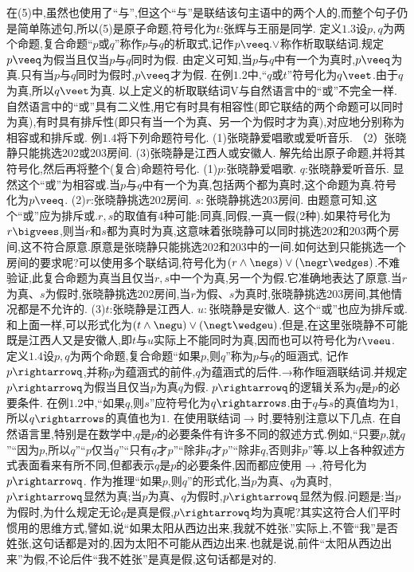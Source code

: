 {在(5)中,虽然也使用了“与”,但这个“与”是联结该句主语中的两个人的,而整个句子仍是简单陈述句,所以(5)是原子命题,符号化为$t$:张辉与王丽是同学.
定义$1.3$设$p,q$为两个命题,复合命题“$p$或$q$”称作$p$与$q$的析取式,记作$p\veeq.\vee$称作析取联结词.规定$p\veeq$为假当且仅当$p$与$q$同时为假.
由定义可知,当$p$与$q$中有一个为真时,$p\veeq$为真.只有当$p$与$q$同时为假时,$p\veeq$才为假.
在例$1.2$中,“$q$或$t$”符号化为$q\veet$.由于$q$为真,所以$q\veet$为真.
以上定义的析取联结词V与自然语言中的“或”不完全一样.自然语言中的“或”具有二义性,用它有时具有相容性(即它联结的两个命题可以同时为真),有时具有排斥性(即只有当一个为真、另一个为假时才为真),对应地分别称为相容或和排斥或.
例$1.4$将下列命题符号化.
(1)张晓静爱唱歌或爱听音乐.
（2）张晓静只能挑选202或203房间.
(3)张晓静是江西人或安徽人.
解先给出原子命题,并将其符号化,然后再将整个(复合)命题符号化.
(1)$p$:张晓静爱唱歌.
$q$:张晓静爱听音乐.
显然这个“或”为相容或.当$p$与$q$中有一个为真,包括两个都为真时,这个命题为真.符号化为$p\veeq$.
(2)$r$:张晓静挑选202房间.
$s:$张晓静挑选203房间.
由题意可知,这个“或”应为排斥或.$r,s$的取值有4种可能:同真,同假,一真一假(2种).如果符号化为$r\bigvees$,则当$r$和$s$都为真时为真,这意味着张晓静可以同时挑选202和203两个房间,这不符合原意.原意是张晓静只能挑选202和203中的一间.如何达到只能挑选一个房间的要求呢?可以使用多个联结词,符号化为$(r\wedge\negs)\vee(\negr\wedges)$.不难验证,此复合命题为真当且仅当$r,s$中一个为真,另一个为假.它准确地表达了原意.当$r$为真、$s$为假时,张晓静挑选202房间,当$r$为假、$s$为真时,张晓静挑选203房间,其他情况都是不允许的.
(3)$t$:张晓静是江西人.
$u:$张晓静是安徽人.
这个“或”也应为排斥或.和上面一样,可以形式化为$(t\wedge\negu)\vee(\negt\wedgeu)$.但是,在这里张晓静不可能既是江西人又是安徽人,即$t$与$u$实际上不能同时为真,因而也可以符号化为$t\veeu$.
定义$1.4$设$p,q$为两个命题,复合命题“如果$p$,则$q$”称为$p$与$q$的晅涵式,
记作$p\rightarrowq$,并称$p$为蕴涵式的前件,$q$为蕴涵式的后件.→称作晅涵联结词.并规定$p\rightarrowq$为假当且仅当$p$为真$q$为假.
$p\rightarrowq$的逻辑关系为$q$是$p$的必要条件.
在例$1.2$中,“如果$q$,则$s$”应符号化为$q\rightarrows$.由于$q$与$s$的真值均为1,所以$q\rightarrows$的真值也为$1.$
在使用联结词$\rightarrow$时,要特别注意以下几点.
在自然语言里,特别是在数学中,$q$是$p$的必要条件有许多不同的叙述方式.例如,“只要$p$,就$q$”“因为$p$,所以$q$”“$p$仅当$q$”“只有$q$才$p$”“除非$q$才$p$”“除非$q$,否则非$p$”等.以上各种叙述方式表面看来有所不同,但都表示$q$是$p$的必要条件,因而都应使用$\rightarrow$,符号化为$p\rightarrowq$.
作为推理“如果$p$,则$q$”的形式化,当$p$为真、$q$为真时,$p\rightarrowq$显然为真;当$p$为真、$q$为假时,$p\rightarrowq$显然为假.问题是:当$p$为假时,为什么规定无论$q$是真是假,$p\rightarrowq$均为真呢?其实这符合人们平时惯用的思维方式,譬如,说“如果太阳从西边出来,我就不姓张.”实际上,不管“我”是否姓张,这句话都是对的,因为太阳不可能从西边出来.也就是说,前件“太阳从西边出来”为假,不论后件“我不姓张”是真是假,这句话都是对的.
}
